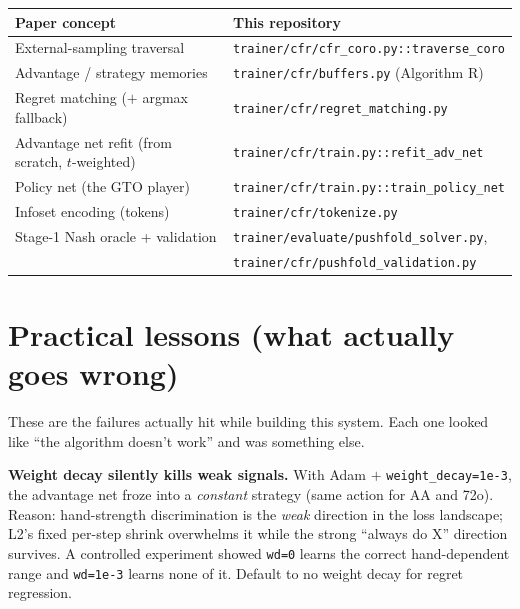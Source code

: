 \documentclass[11pt,a4paper]{article}
\begin{document}
\begin{center}
\small
\begin{tabular}{@{}ll@{}}
\toprule
Paper concept & This repository \\
\midrule
External-sampling traversal      & \texttt{trainer/cfr/cfr\_coro.py::traverse\_coro} \\
Advantage / strategy memories    & \texttt{trainer/cfr/buffers.py} (Algorithm R) \\
Regret matching ($+$ argmax fallback) & \texttt{trainer/cfr/regret\_matching.py} \\
Advantage net refit (from scratch, $t$-weighted) & \texttt{trainer/cfr/train.py::refit\_adv\_net} \\
Policy net (the GTO player)      & \texttt{trainer/cfr/train.py::train\_policy\_net} \\
Infoset encoding (tokens)        & \texttt{trainer/cfr/tokenize.py} \\
Stage-1 Nash oracle + validation & \texttt{trainer/evaluate/pushfold\_solver.py},\\
                                 & \texttt{trainer/cfr/pushfold\_validation.py} \\
\bottomrule
\end{tabular}
\end{center}

\section{Practical lessons (what actually goes wrong)}\label{sec:lessons}

These are the failures actually hit while building this system. Each one
looked like ``the algorithm doesn't work'' and was something else.

\begin{trap}
\textbf{Weight decay silently kills weak signals.}
With Adam $+$ \texttt{weight\_decay=1e-3}, the advantage net froze into a
\emph{constant} strategy (same action for AA and 72o). Reason: hand-strength
discrimination is the \emph{weak} direction in the loss landscape; L2's fixed
per-step shrink overwhelms it while the strong ``always do X'' direction
survives. A controlled experiment showed \texttt{wd=0} learns the correct
hand-dependent range and \texttt{wd=1e-3} learns none of it. Default to no
weight decay for regret regression.
\end{trap}
\end{document}
